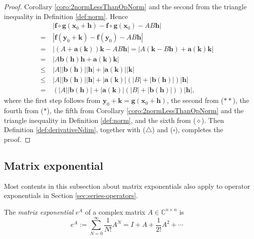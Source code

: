 \begin{proof}
  Corollary \ref{coro:2normLessThanOpNorm} and the second from
  the triangle inequality in Definition \ref{def:norm}.
  Hence
  \begin{align*}
    &\ |\mathbf{f}\circ \mathbf{g}(\mathbf{x}_{0}+\mathbf{h})
      -\mathbf{f}\circ \mathbf{g}(\mathbf{x}_{0})-AB\mathbf{h}|\\
    =
    &\ |\mathbf{f}(\mathbf{y}_{0}+\mathbf{k})-
      \mathbf{f}(\mathbf{y}_{0})-AB\mathbf{h}| \\
    =
    &\ |(A+\mathbf{a}(\mathbf{k}))\mathbf{k}-AB\mathbf{h}|
      = |A(\mathbf{k}-B\mathbf{h})+\mathbf{a}(\mathbf{k})\mathbf{k}|\\
    =
    &\ |A\mathbf{b}(\mathbf{h})\mathbf{h}
      +\mathbf{a}(\mathbf{k})\mathbf{k}|\\
    \le
    &\ |A||\mathbf{b}(\mathbf{h})||\mathbf{h}|
      +|\mathbf{a}(\mathbf{k})||\mathbf{k}|\\
    \le
    &\ |A||\mathbf{b}(\mathbf{h})||\mathbf{h}|
      +|\mathbf{a}(\mathbf{k})|(|B|+|\mathbf{b}(\mathbf{h})|)|\mathbf{h}|
    \\ =
    &\ (|A||\mathbf{b}(\mathbf{h})|+|\mathbf{a}(\mathbf{k})|
       (|B|+|\mathbf{b}(\mathbf{h})|))|\mathbf{h}|,
  \end{align*}
  where the first step follows from
  $\mathbf{y}_{0}+\mathbf{k}=\mathbf{g}(\mathbf{x}_{0}+\mathbf{h})$,
  the second from ($**$), the fourth from ($*$), the fifth from
  Corollary \ref{coro:2normLessThanOpNorm} and
  the triangle inequality in Definition \ref{def:norm},
  and the sixth from
  ($\diamond$). Then Definition \ref{def:derivativeNdim}, together with
  ($\triangle$) and ($\square$), completes the proof.
\end{proof}

\subsection{Matrix exponential}
\label{sec:matrix-exponential}

\begin{rem}
  Most contents in this subsection %
  about matrix exponentials
  also apply to operator exponentials in Section \ref{sec:series-operators}.
\end{rem}

\begin{defn}
  \label{def:matrixExponential}
  The \emph{matrix exponential} $e^{A}$
  of a complex matrix $A\in \mathbb{C}^{n\times n}$ is 
  \begin{equation}
    \label{eq:matrixExponential}
    e^{A} 
    := \sum_{N=0}^{\infty}\frac{1}{N!}A^N
    = I + A + \frac{1}{2!}A^2 + \cdots
  \end{equation}
\end{defn}

